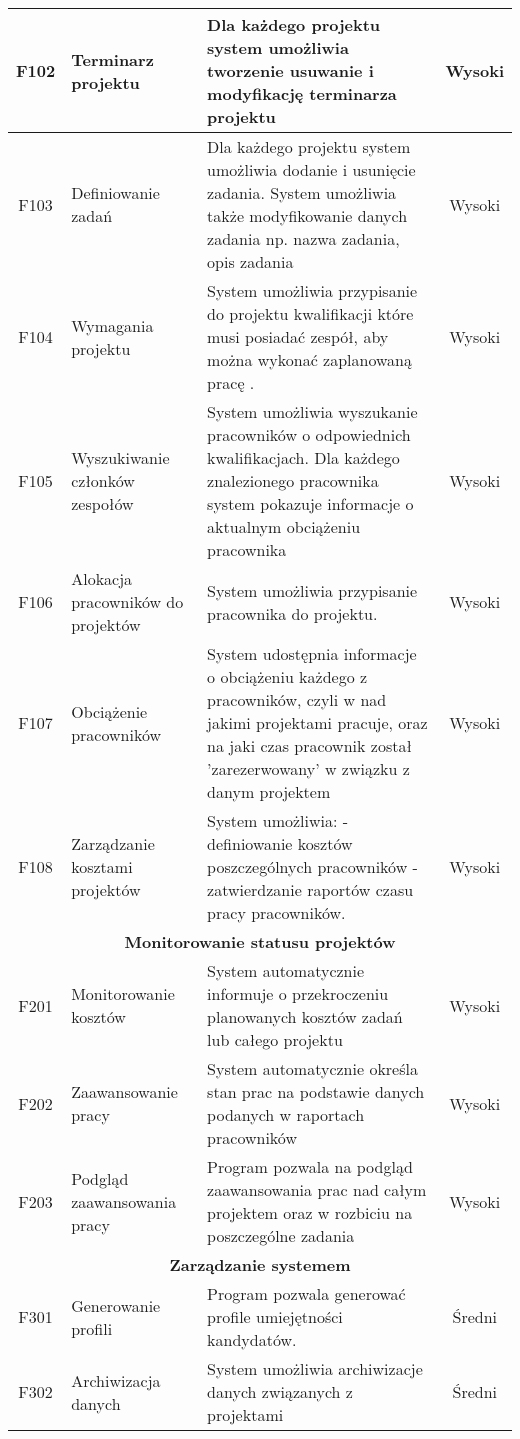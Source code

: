\begin{tabularx}{\textwidth}{|c|X|X|c|}
\hline
F102 & Terminarz projektu & Dla każdego projektu system umożliwia tworzenie usuwanie i modyfikację terminarza projektu & Wysoki \\
\hline 
F103 & Definiowanie zadań & Dla każdego projektu system umożliwia dodanie i usunięcie zadania. System umożliwia także modyfikowanie danych zadania np. nazwa zadania, opis zadania & Wysoki \\ 
\hline 
F104 & Wymagania projektu & System umożliwia przypisanie do projektu kwalifikacji które musi posiadać zespół, aby można wykonać zaplanowaną pracę . & Wysoki \\ 
\hline 
F105 & Wyszukiwanie członków zespołów & System umożliwia wyszukanie pracowników o odpowiednich kwalifikacjach. Dla każdego znalezionego pracownika system pokazuje informacje o aktualnym obciążeniu pracownika& Wysoki \\ 
\hline 
F106 & Alokacja pracowników do projektów & System umożliwia przypisanie pracownika do projektu. & Wysoki \\ 
\hline 
F107 & Obciążenie pracowników & System udostępnia informacje o obciążeniu każdego z pracowników, czyli w nad jakimi projektami pracuje, oraz na jaki czas pracownik został 'zarezerwowany' w związku z danym projektem & Wysoki \\ 
\hline 
F108 & Zarządzanie kosztami projektów & System umożliwia: \newline
- definiowanie kosztów poszczególnych pracowników \newline
- zatwierdzanie raportów czasu pracy pracowników. & Wysoki \\
\hline
\multicolumn{4}{|c|}{\textbf{Monitorowanie statusu projektów}} \\
\hline 
F201 & Monitorowanie kosztów & System automatycznie informuje o przekroczeniu planowanych kosztów zadań lub całego projektu & Wysoki \\ 
\hline 
F202 & Zaawansowanie pracy & System automatycznie określa stan prac na podstawie danych podanych w raportach pracowników & Wysoki \\
\hline 
F203 & Podgląd zaawansowania pracy & Program pozwala na podgląd zaawansowania prac nad całym projektem oraz w rozbiciu na poszczególne zadania & Wysoki \\
\hline 
\multicolumn{4}{|c|}{\textbf{Zarządzanie systemem}} \\
\hline 
F301 & Generowanie profili & Program pozwala generować profile umiejętności kandydatów.  & Średni \\ 
\hline
F302 & Archiwizacja danych & System umożliwia archiwizacje danych związanych z projektami & Średni \\ 
\hline
\end{tabularx} 

